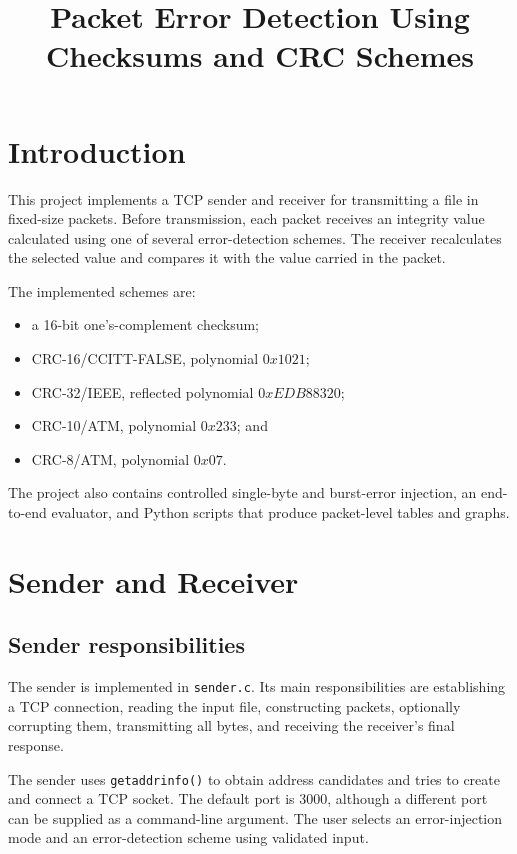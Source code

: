\documentclass[12pt,a4paper]{article}
\title{Packet Error Detection Using Checksums and CRC Schemes}
\author{}
\date{}
\begin{document}
\maketitle
\tableofcontents
\newpage

\section{Introduction}

This project implements a TCP sender and receiver for transmitting a file in
fixed-size packets. Before transmission, each packet receives an integrity
value calculated using one of several error-detection schemes. The receiver
recalculates the selected value and compares it with the value carried in the
packet.

The implemented schemes are:

\begin{itemize}
  \item a 16-bit one's-complement checksum;
  \item CRC-16/CCITT-FALSE, polynomial $0x1021$;
  \item CRC-32/IEEE, reflected polynomial $0xEDB88320$;
  \item CRC-10/ATM, polynomial $0x233$; and
  \item CRC-8/ATM, polynomial $0x07$.
\end{itemize}

The project also contains controlled single-byte and burst-error injection,
an end-to-end evaluator, and Python scripts that produce packet-level tables
and graphs.

\section{Sender and Receiver}

\subsection{Sender responsibilities}

The sender is implemented in \texttt{sender.c}. Its main responsibilities
are establishing a TCP connection, reading the input file, constructing
packets, optionally corrupting them, transmitting all bytes, and receiving
the receiver's final response.

The sender uses \texttt{getaddrinfo()} to obtain address candidates and tries
to create and connect a TCP socket. The default port is 3000, although a
different port can be supplied as a command-line argument. The user selects
an error-injection mode and an error-detection scheme using validated input.
\end{document}
